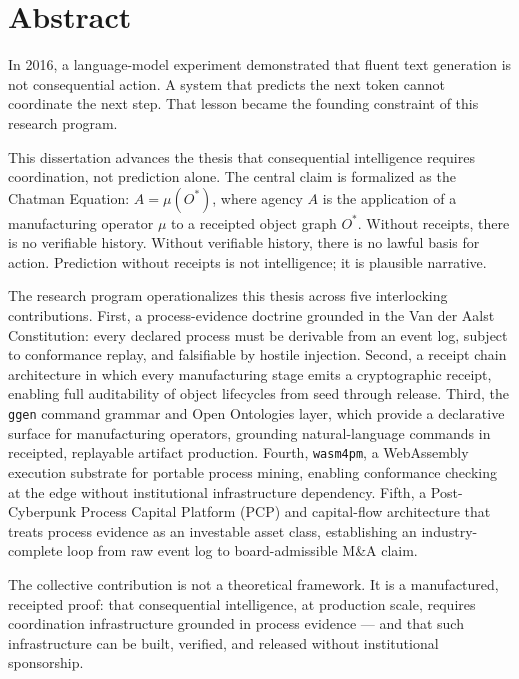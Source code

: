 \chapter*{Abstract}

In 2016, a language-model experiment demonstrated that fluent text generation is not consequential action.
A system that predicts the next token cannot coordinate the next step.
That lesson became the founding constraint of this research program.

This dissertation advances the thesis that consequential intelligence requires coordination, not prediction alone.
The central claim is formalized as the Chatman Equation: $A = \mu(O^*)$, where agency $A$ is the application of a manufacturing operator $\mu$ to a receipted object graph $O^*$.
Without receipts, there is no verifiable history.
Without verifiable history, there is no lawful basis for action.
Prediction without receipts is not intelligence; it is plausible narrative.

The research program operationalizes this thesis across five interlocking contributions.
First, a process-evidence doctrine grounded in the Van der Aalst Constitution: every declared process must be derivable from an event log, subject to conformance replay, and falsifiable by hostile injection.
Second, a receipt chain architecture in which every manufacturing stage emits a cryptographic receipt, enabling full auditability of object lifecycles from seed through release.
Third, the \texttt{ggen} command grammar and Open Ontologies layer, which provide a declarative surface for manufacturing operators, grounding natural-language commands in receipted, replayable artifact production.
Fourth, \texttt{wasm4pm}, a WebAssembly execution substrate for portable process mining, enabling conformance checking at the edge without institutional infrastructure dependency.
Fifth, a Post-Cyberpunk Process Capital Platform (PCP) and capital-flow architecture that treats process evidence as an investable asset class, establishing an industry-complete loop from raw event log to board-admissible M\&A claim.

The collective contribution is not a theoretical framework.
It is a manufactured, receipted proof: that consequential intelligence, at production scale, requires coordination infrastructure grounded in process evidence --- and that such infrastructure can be built, verified, and released without institutional sponsorship.

\newpage

